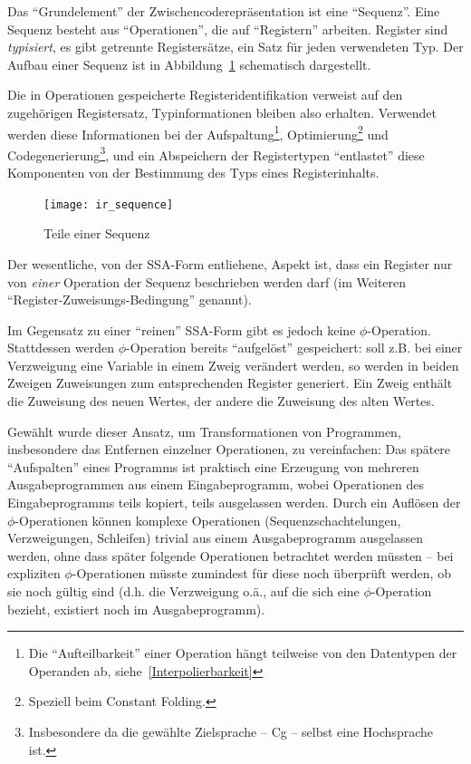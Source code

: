 \documentclass[twoside,a4paper,fleqn,12pt]{book}
\begin{document}
Das "`Grundelement"' der Zwischencoderepräsentation ist eine "`Sequenz"'. Eine Sequenz besteht aus "`Operationen"',
die auf "`Registern"' arbeiten. Register sind \emph{typisiert}, es gibt getrennte Registersätze, ein Satz für jeden verwendeten Typ. 
Der Aufbau einer Sequenz ist in Abbildung~\ref{fig:ir_sequence} schematisch dargestellt.

Die in Operationen gespeicherte Registeridentifikation verweist auf den zugehörigen Registersatz, Typinformationen bleiben also erhalten.
Verwendet werden diese Informationen bei der Aufspaltung\footnote{Die "`Aufteilbarkeit"' einer Operation hängt teilweise von den Datentypen der Operanden ab,
siehe~\ref{Interpolierbarkeit}},
Optimierung\footnote{Speziell beim Constant Folding.} und
Codegenerierung\footnote{Insbesondere da die gewählte Zielsprache -- Cg -- selbst eine Hochsprache ist.},
und ein Abspeichern der Registertypen "`entlastet"' diese Komponenten von der Bestimmung des Typs eines Registerinhalts.

\begin{figure}[h]
   \centering
  \texttt{[image: ir\_sequence]}
  \caption{Teile einer Sequenz}
  \label{fig:ir_sequence}
\end{figure}

Der wesentliche, von der SSA-Form entliehene, Aspekt ist, dass ein Register nur von \emph{einer} Operation der Sequenz beschrieben werden darf
(im Weiteren "`Register-Zuweisungs-Bedingung"' genannt).

Im Gegensatz zu einer "`reinen"' SSA-Form gibt es jedoch keine $\phi$-Operation. Stattdessen werden $\phi$-Operation bereits "`aufgelöst"'
gespeichert: soll z.B. bei einer Verzweigung eine Variable in einem Zweig verändert werden, so werden in beiden Zweigen Zuweisungen zum
entsprechenden Register generiert. Ein Zweig enthält die Zuweisung des neuen Wertes, der andere die Zuweisung des alten Wertes.

Gewählt wurde dieser Ansatz, um Transformationen von Programmen, insbesondere das Entfernen einzelner Operationen, zu vereinfachen:
Das spätere "`Aufspalten"' eines Programms ist praktisch eine Erzeugung von mehreren Ausgabeprogrammen aus einem Eingabeprogramm,
wobei Operationen des Eingabeprogramms teils kopiert, teils ausgelassen werden. Durch ein Auflösen der $\phi$-Operationen können
komplexe Operationen (Sequenzschachtelungen, Verzweigungen, Schleifen)
trivial aus einem Ausgabeprogramm ausgelassen werden, ohne dass später folgende Operationen betrachtet werden müssten -- 
bei expliziten $\phi$-Operationen müsste zumindest für diese noch überprüft
werden, ob sie noch gültig sind (d.h. die Verzweigung o.ä., auf die sich eine $\phi$-Operation bezieht, existiert noch im Ausgabeprogramm).
\end{document}
